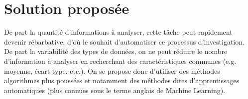 \section{Solution proposée}
De part la quantité d'informations à analyser, cette tâche peut rapidement devenir rébarbative, d'où le souhait d'automatiser ce processus d'investigation. De part la variabilité des types de données, on ne peut réduire le nombre d'information à analyser en recherchant des caractéristiques communes (e.g. moyenne, écart type, etc.). On se propose donc d'utiliser des méthodes algorithmes plus poussées  et notamment des méthodes dites  d'apprentissages automatiques (plus connues sous le terme anglais de Machine Learning). 